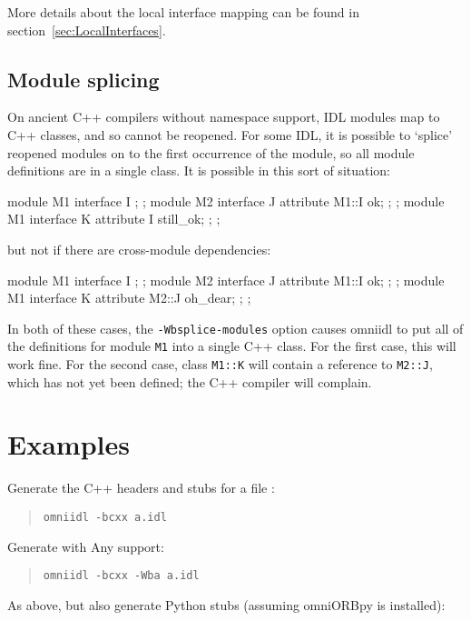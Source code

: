 \documentclass[11pt,oneside,a4paper]{book}
\newcommand{\type}[1]{\texttt{#1}}
\newcommand{\intf}[1]{\texttt{#1}}
\newcommand{\cmdline}[1]{\texttt{#1}}
\begin{document}
More details about the local interface mapping can be found in
section~\ref{sec:LocalInterfaces}.


\subsection{Module splicing}

On ancient C++ compilers without namespace support, IDL modules map to
C++ classes, and so cannot be reopened. For some IDL, it is possible
to `splice' reopened modules on to the first occurrence of the module,
so all module definitions are in a single class. It is possible in
this sort of situation:

\begin{idllisting}
module M1 {
  interface I {};
};
module M2 {
  interface J {
    attribute M1::I ok;
  };
};
module M1 {
  interface K {
    attribute I still_ok;
  };
};
\end{idllisting}

\noindent but not if there are cross-module dependencies:

\begin{idllisting}
module M1 {
  interface I {};
};
module M2 {
  interface J {
    attribute M1::I ok;
  };
};
module M1 {
  interface K {
    attribute M2::J oh_dear;
  };
};
\end{idllisting}

\noindent In both of these cases, the \cmdline{-Wbsplice-modules}
option causes omniidl to put all of the definitions for module
\intf{M1} into a single C++ class. For the first case, this will work
fine. For the second case, class \type{M1::K} will contain a reference
to \type{M2::J}, which has not yet been defined; the C++ compiler will
complain.


\section{Examples}

Generate the C++ headers and stubs for a file :

\begin{quote}
\cmdline{omniidl -bcxx a.idl}
\end{quote}

\noindent Generate with Any support:

\begin{quote}
\cmdline{omniidl -bcxx -Wba a.idl}
\end{quote}

\noindent As above, but also generate Python stubs (assuming omniORBpy
is installed):
\end{document}
